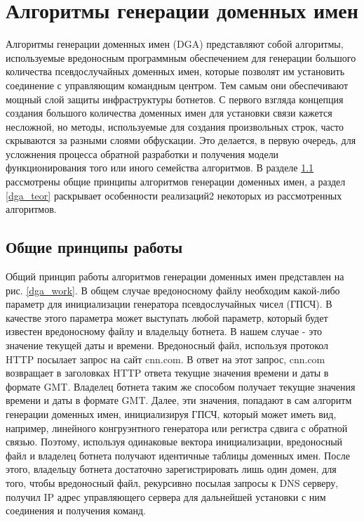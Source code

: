 \section{Алгоритмы генерации доменных имен}\label{dga}
Алгоритмы генерации доменных имен (DGA) представляют собой алгоритмы, используемые вредоносным программным обеспечением для генерации большого количества псевдослучайных доменных имен, которые позволят им установить соединение с управляющим командным центром. Тем самым они обеспечивают мощный слой защиты инфраструктуры ботнетов. С первого взгляда концепция создания большого количества доменных имен для установки связи кажется несложной, но методы, используемые для создания произвольных строк, часто скрываются за разными слоями обфускации. Это делается, в первую очередь, для усложнения процесса обратной разработки и получения модели функционирования того или иного семейства алгоритмов. В разделе \ref{work_princip} рассмотрены общие принципы алгоритмов генерации доменных имен, а раздел \ref{dga_teor} раскрывает особенности реализаций2 некоторых из рассмотренных алгоритмов.

    \subsection{Общие принципы работы}\label{work_princip}
        Общий принцип работы алгоритмов генерации доменных имен представлен на рис. \ref{dga_work}. В общем случае вредоносному файлу необходим какой-либо параметр для инициализации генератора псевдослучайных чисел (ГПСЧ). В качестве этого параметра может выступать любой параметр, который будет известен вредоносному файлу и владельцу ботнета. В нашем случае - это значение текущей даты и времени. Вредоносный файл, используя протокол HTTP посылает запрос на сайт cnn.com. В ответ на этот запрос, cnn.com возвращает в заголовках HTTP ответа текущие значения времени и даты в формате GMT. Владелец ботнета таким же способом получает текущие значения времени и даты в формате GMT. Далее, эти значения, попадают в сам алгоритм генерации доменных имен, инициализируя ГПСЧ, который может иметь вид, например, линейного конгруэнтного генератора или  регистра сдвига с обратной связью. Поэтому, используя одинаковые вектора инициализации, вредоносный файл и владелец ботнета получают идентичные таблицы доменных имен.
        После этого, владельцу ботнета достаточно зарегистрировать лишь один домен, для того, чтобы вредоносный файл, рекурсивно посылая запросы к DNS серверу, получил IP адрес управляющего сервера для дальнейшей установки с ним соединения и получения команд.

